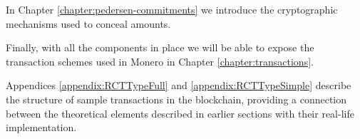 In Chapter \ref{chapter:pedersen-commitments} we introduce the cryptographic mechanisms used to conceal amounts.

Finally, with all the components in place we will be able to expose the transaction
schemes used in Monero in Chapter \ref{chapter:transactions}.




Appendices \ref{appendix:RCTTypeFull} and \ref{appendix:RCTTypeSimple} describe the structure of sample
transactions in the blockchain, providing a connection between the theoretical elements described in earlier sections with 
their real-life implementation.







